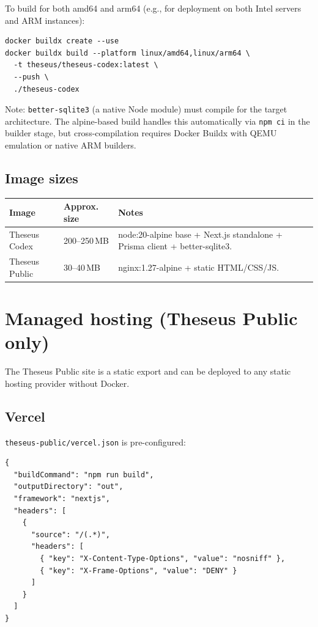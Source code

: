 \documentclass[11pt,letterpaper]{article}
\newcommand{\file}[1]{\texttt{#1}}
\newcommand{\cmd}[1]{\texttt{#1}}
\begin{document}
To build for both amd64 and arm64 (e.g., for deployment on both Intel servers and ARM instances):

\begin{lstlisting}
docker buildx create --use
docker buildx build --platform linux/amd64,linux/arm64 \
  -t theseus/theseus-codex:latest \
  --push \
  ./theseus-codex
\end{lstlisting}

Note: \cmd{better-sqlite3} (a native Node module) must compile for the target architecture. The alpine-based build handles this automatically via \cmd{npm ci} in the builder stage, but cross-compilation requires Docker Buildx with QEMU emulation or native ARM builders.

\subsection{Image sizes}

\begin{table}[h]
\small
\begin{tabular}{p{4cm} p{3cm} p{7cm}}
\toprule
\textbf{Image} & \textbf{Approx. size} & \textbf{Notes} \\
\midrule
Theseus Codex & 200--250\,MB & node:20-alpine base + Next.js standalone + Prisma client + better-sqlite3. \\
Theseus Public & 30--40\,MB & nginx:1.27-alpine + static HTML/CSS/JS. \\
\bottomrule
\end{tabular}
\end{table}

\section{Managed hosting (Theseus Public only)}

The Theseus Public site is a static export and can be deployed to any static hosting provider without Docker.

\subsection{Vercel}

\file{theseus-public/vercel.json} is pre-configured:

\begin{lstlisting}
{
  "buildCommand": "npm run build",
  "outputDirectory": "out",
  "framework": "nextjs",
  "headers": [
    {
      "source": "/(.*)",
      "headers": [
        { "key": "X-Content-Type-Options", "value": "nosniff" },
        { "key": "X-Frame-Options", "value": "DENY" }
      ]
    }
  ]
}
\end{lstlisting}
\end{document}
